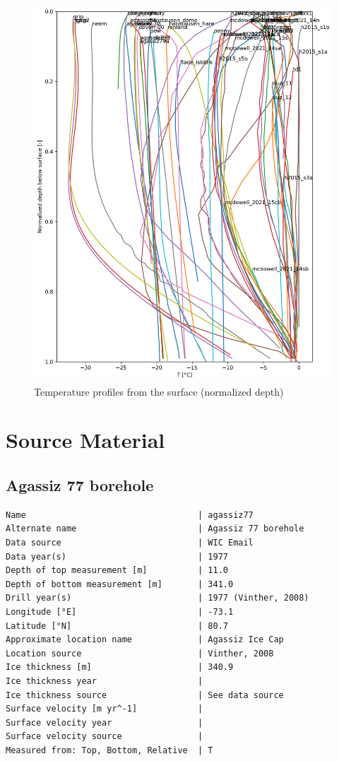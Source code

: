 \documentclass[article,a4paper,times,11pt,twoside]{article}
\begin{document}
\begin{figure}[!h]
\centering
\includegraphics[width=.9\linewidth]{./T_norm.png}
\caption{\label{fig:T_norm}Temperature profiles from the surface (normalized depth)}
\end{figure}

\clearpage
\section{Source Material}
\label{sec:orgf512084}
\subsection{Agassiz 77 borehole}
\label{sec:org4405a43}
\begin{verbatim}
Name                                  | agassiz77
Alternate name                        | Agassiz 77 borehole 
Data source                           | WIC Email
Data year(s)                          | 1977
Depth of top measurement [m]          | 11.0 
Depth of bottom measurement [m]       | 341.0 
Drill year(s)                         | 1977 (Vinther, 2008)
Longitude [°E]                        | -73.1 
Latitude [°N]                         | 80.7 
Approximate location name             | Agassiz Ice Cap 
Location source                       | Vinther, 2008
Ice thickness [m]                     | 340.9 
Ice thickness year                    | 
Ice thickness source                  | See data source 
Surface velocity [m yr^-1]            | 
Surface velocity year                 | 
Surface velocity source               | 
Measured from: Top, Bottom, Relative  | T 
\end{verbatim}
\end{document}
